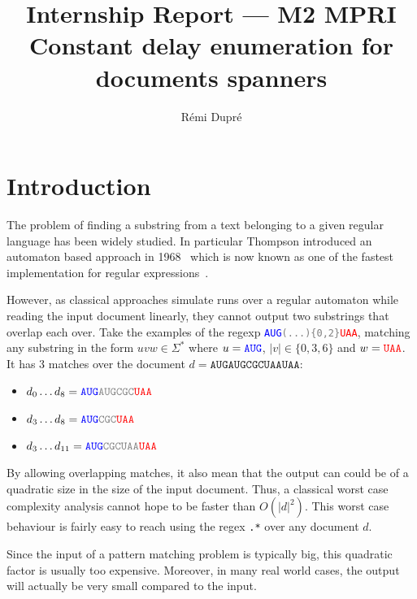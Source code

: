 \documentclass[12px]{article}
\title{%
  Internship Report --- M2 MPRI \\
  Constant delay enumeration for documents spanners
}
\author{Rémi Dupré}
\theoremstyle{definition}
\begin{document}
  \maketitle

  
  \pagebreak
  \tableofcontents
  \pagebreak

  \section{Introduction}

    The problem of finding a substring from a text belonging to a given
    regular language has been widely studied. In particular Thompson
    introduced an automaton based approach in
    1968~\cite{thompson1968programming} which is now known as one of the
    fastest implementation for regular expressions~\cite{cox2007regular}.

    However, as classical approaches simulate runs over a regular automaton
    while reading the input document linearly, they cannot output two
    substrings that overlap each over. Take the examples of the regexp
    \texttt{\textcolor{blue}{AUG}\textcolor{gray}{(...)\{0,2\}}\textcolor{red}{UAA}},
    matching any substring in the form $uvw \in \Sigma^*$ where $u =
    \texttt{\textcolor{blue}{AUG}}$, $|v| \in \{0, 3, 6\}$ and $w =
    \texttt{\textcolor{red}{UAA}}$. It has 3 matches over the document $d =
    \texttt{AUGAUGCGCUAAUAA}$:
      \begin{itemize}
        \item $d_0 \ldots d_8 =
          \texttt{\textcolor{blue}{AUG}\textcolor{gray}{AUGCGC}\textcolor{red}{UAA}}$
        \item $d_3 \ldots d_8 =
          \texttt{\textcolor{blue}{AUG}\textcolor{gray}{CGC}\textcolor{red}{UAA}}$
        \item $d_3 \ldots d_{11} =
          \texttt{\textcolor{blue}{AUG}\textcolor{gray}{CGCUAA}\textcolor{red}{UAA}}$
      \end{itemize}

    By allowing overlapping matches, it also mean that the output can could be
    of a quadratic size in the size of the input document. Thus, a classical
    worst case complexity analysis cannot hope to be faster than $O(|d|^2)$.
    This worst case behaviour is fairly easy to reach using the regex
    \texttt{.*} over any document $d$.

    Since the input of a pattern matching problem is typically big, this
    quadratic factor is usually too expensive. Moreover, in many real world
    cases, the output will actually be very small compared to the input.
\end{document}

